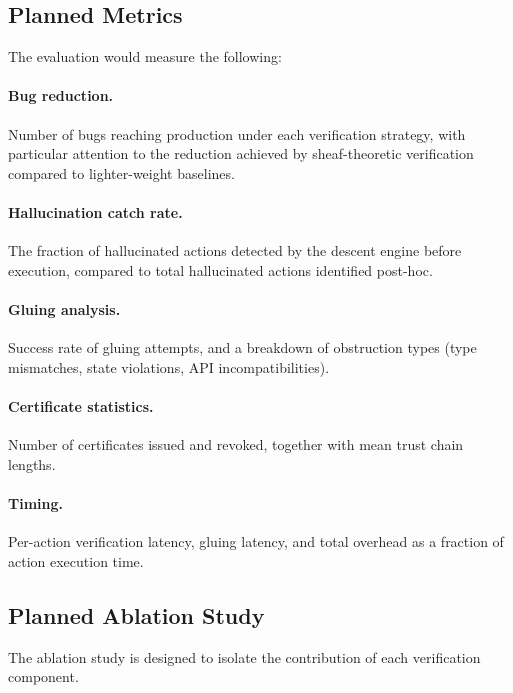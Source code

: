 \documentclass[11pt]{article}
\begin{document}
\subsection{Planned Metrics}\label{subsec:results}

The evaluation would measure the following:

\paragraph{Bug reduction.}
Number of bugs reaching production under each verification strategy,
with particular attention to the reduction achieved by
sheaf-theoretic verification compared to lighter-weight baselines.

\paragraph{Hallucination catch rate.}
The fraction of hallucinated actions detected by the descent engine
before execution, compared to total hallucinated actions identified
post-hoc.

\paragraph{Gluing analysis.}
Success rate of gluing attempts, and a breakdown of obstruction types
(type mismatches, state violations, API incompatibilities).

\paragraph{Certificate statistics.}
Number of certificates issued and revoked, together with mean trust
chain lengths.

\paragraph{Timing.}
Per-action verification latency, gluing latency, and total overhead
as a fraction of action execution time.

\subsection{Planned Ablation Study}\label{subsec:ablation}

The ablation study is designed to isolate the contribution of each
verification component.
\end{document}
